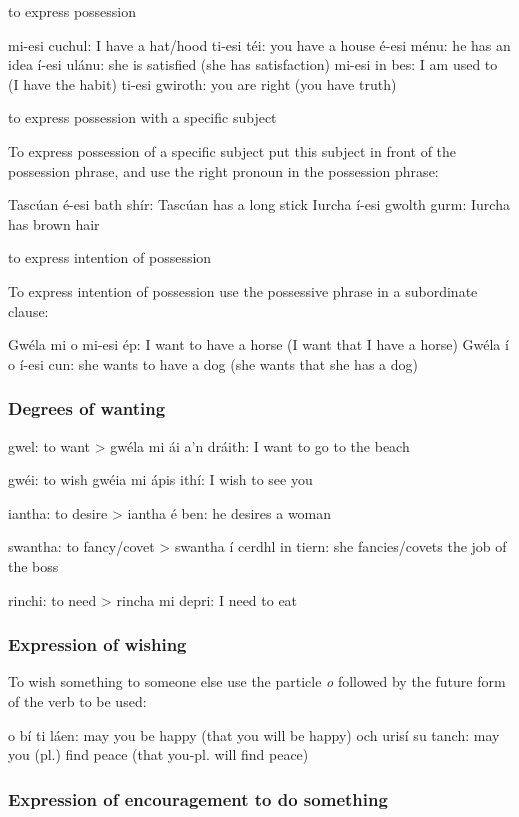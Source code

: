     to express possession

mi-esi cuchul: I have a hat/hood
ti-esi t\'{e}i: you have a house
\'{e}-esi m\'{e}nu: he has an idea
\'{i}-esi ul\'{a}nu: she is satisfied (she has satisfaction)
mi-esi in bes: I am used to (I have the habit)
ti-esi gwiroth: you are right (you have truth)

    to express possession with a specific subject

To express possession of a specific subject put this subject in front of the possession phrase, and use the right pronoun in the possession phrase:

Tasc\'{u}an \'{e}-esi bath sh\'{i}r: Tasc\'{u}an has a long stick
Iurcha \'{i}-esi gwolth gurm: Iurcha has brown hair

    to express intention of possession

To express intention of possession use the possessive phrase in a subordinate clause:

Gw\'{e}la mi o mi-esi \'{e}p: I want to have a horse (I want that I have a horse)
Gw\'{e}la \'{i} o \'{i}-esi cun: she wants to have a dog (she wants that she has a dog)

\subsubsection{Degrees of wanting}

gwel: to want
> gw\'{e}la mi \'{a}i a'n dr\'{a}ith: I want to go to the beach

gw\'{e}i: to wish
gw\'{e}ia mi \'{a}pis ith\'{i}: I wish to see you

iantha: to desire
> iantha \'{e} ben: he desires a woman

swantha: to fancy/covet
> swantha \'{i} cerdhl in tiern: she fancies/covets the job of the boss

rinchi: to need
> rincha mi depri: I need to eat

\subsubsection{Expression of wishing}

To wish something to someone else use the particle \textit{o} followed by the future form of the verb to be used:

o b\'{i} ti l\'{a}en: may you be happy (that you will be happy)
och uris\'{i} su tanch: may you (pl.) find peace (that you-pl. will find peace)
 
\subsubsection{Expression of encouragement to do something}

